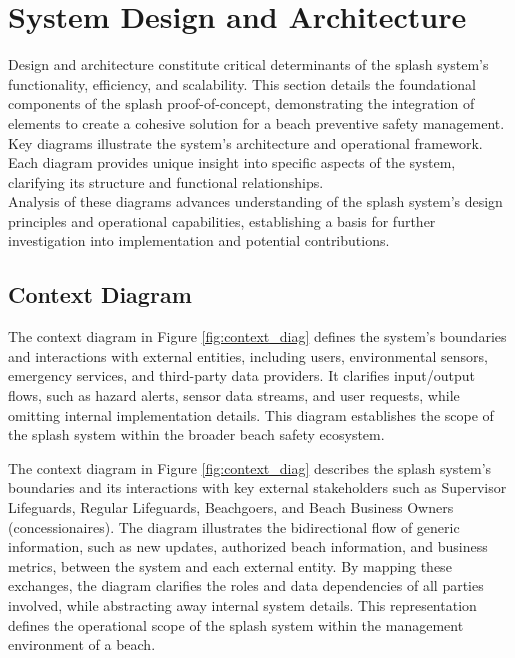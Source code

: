 \chapter{System Design and Architecture}
\label{chapter:architecture}

Design and architecture constitute critical determinants of the \ac{splash} system's functionality, efficiency, and scalability. This section details the foundational components of the \ac{splash} proof-of-concept, demonstrating the integration of elements to create a cohesive solution for a beach preventive safety management. \\
Key diagrams illustrate the system’s architecture and operational framework. Each diagram provides unique insight into specific aspects of the system, clarifying its structure and functional relationships. \\
Analysis of these diagrams advances understanding of the \ac{splash} system’s design principles and operational capabilities, establishing a basis for further investigation into implementation and potential contributions.

\newpage
\section{Context Diagram}
\label{section:context_diag}

The context diagram in Figure \ref{fig:context_diag} defines the system’s boundaries and interactions with external entities, including users, environmental sensors, emergency services, and third-party data providers. It clarifies input/output flows, such as hazard alerts, sensor data streams, and user requests, while omitting internal implementation details. This diagram establishes the scope of the \ac{splash} system within the broader beach safety ecosystem.

The context diagram in Figure \ref{fig:context_diag} describes the \ac{splash} system’s boundaries and its interactions with key external stakeholders such as Supervisor Lifeguards, Regular Lifeguards, Beachgoers, and Beach Business Owners (concessionaires). The diagram illustrates the bidirectional flow of generic information, such as new updates, authorized beach information, and business metrics, between the system and each external entity. By mapping these exchanges, the diagram clarifies the roles and data dependencies of all parties involved, while abstracting away internal system details. This representation defines the operational scope of the \ac{splash} system within the management environment of a beach.

